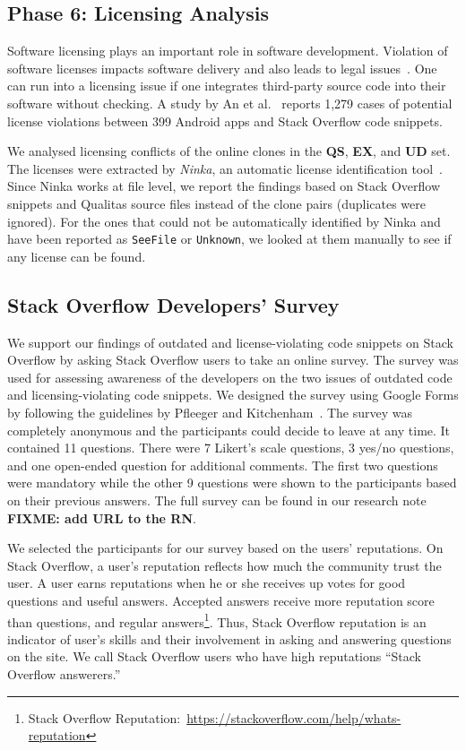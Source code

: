 \documentclass[10pt,journal,compsoc]{IEEEtran}
\newcommand\FIXME[1]{{\color{red}\textbf{FIXME: #1}}}
\begin{document}
\subsection{Phase 6: Licensing Analysis} Software licensing plays an important
role in software development. Violation of software licenses impacts software
delivery and also leads to legal issues~\cite{Sprigman2015}. 
One can run into a licensing issue if one integrates third-party source code
into their software without checking. A study by An et al.~\cite{An2017} reports
1,279 cases of potential license violations between 399 Android apps and Stack
Overflow code snippets.

We analysed licensing conflicts of the online clones in the \textbf{QS},
\textbf{EX}, and \textbf{UD} set. The licenses were extracted by \emph{Ninka},
an automatic license identification tool~\cite{German2010}. Since Ninka works at
file level, we report the findings based on Stack Overflow snippets and Qualitas
source files instead of the clone pairs (duplicates were ignored). For the ones
that could not be automatically identified by Ninka and have been reported as
{\small\texttt{SeeFile}} or {\small\texttt{Unknown}}, we looked at them manually
to see if any license can be found.

\subsection{Stack Overflow Developers' Survey} We support our findings of
outdated and license-violating code snippets on Stack Overflow by asking Stack
Overflow users to take an online survey. The survey was used for assessing awareness of
the developers on the two issues of outdated code and licensing-violating code
snippets. We designed the survey using Google Forms by following the guidelines by Pfleeger and
Kitchenham~\cite{Pfleeger2001,Kitchenham2002}. The survey was completely
anonymous and the participants could decide to leave at any time. It contained
11 questions. There were 7 Likert's scale questions, 3 yes/no questions, and one
open-ended question for additional comments. The first two questions were
mandatory while the other 9 questions were shown to the participants based on
their previous answers. The full survey can be found in our research note~
\FIXME{add URL to the RN}.

We selected the participants for our survey based on the users' reputations. On
Stack Overflow, a user's reputation reflects how much the community trust the
user. A user earns reputations when he or she receives up votes for good
questions and useful answers. Accepted answers receive more reputation score
than questions, and regular answers\footnote{Stack Overflow
	Reputation:~\url{https://stackoverflow.com/help/whats-reputation}}. Thus, Stack
Overflow reputation is an indicator of user's skills and their involvement in
asking and answering questions on the site. We call Stack Overflow users who
have high reputations ``Stack Overflow answerers.''
\end{document}
